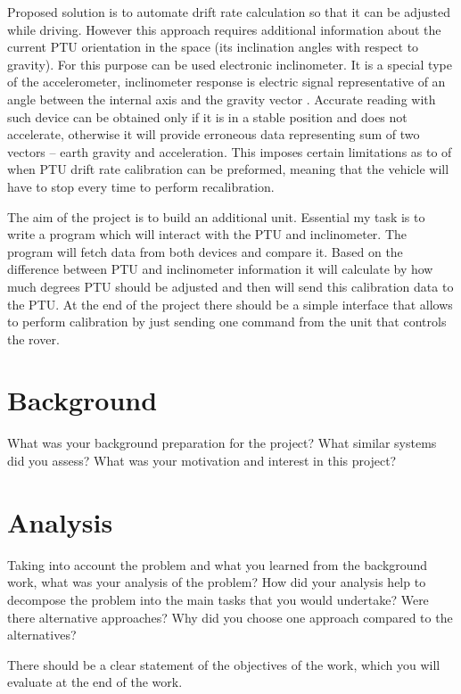 Proposed solution is to automate drift rate calculation so that it can be adjusted while driving. However this approach requires additional information about the current PTU orientation in the space (its inclination angles with respect to gravity). For this purpose can be used electronic inclinometer. It is a special type of the accelerometer, inclinometer response is electric signal representative of an angle between the internal axis and the gravity vector \cite{JacobFraden2010}. Accurate reading with such device can be obtained only if it is in a stable position and does not accelerate, otherwise it will provide erroneous data representing sum of two vectors – earth gravity and acceleration. This imposes certain limitations as to of when PTU drift rate calibration can be preformed, meaning that the vehicle will have to stop every time to perform recalibration.  

The aim of the project is to build an additional unit. Essential my task is to write a program which will interact with the PTU and inclinometer. The program will fetch data from both devices and compare it. Based on the difference between PTU and inclinometer information it will calculate by how much degrees PTU should be adjusted and then will send this calibration data to the PTU. At the end of the project there should be a simple interface that allows to perform calibration by just sending one command from the unit that controls the rover.

\section{Background}
What was your background preparation for the project? What similar systems did you assess? What was your motivation and interest in this project? 

   

\section{Analysis}
Taking into account the problem and what you learned from the background work, what was your analysis of the problem? How did your analysis help to decompose the problem into the main tasks that you would undertake? Were there alternative approaches? Why did you choose one approach compared to the alternatives? 

There should be a clear statement of the objectives of the work, which you will evaluate at the end of the work. 

